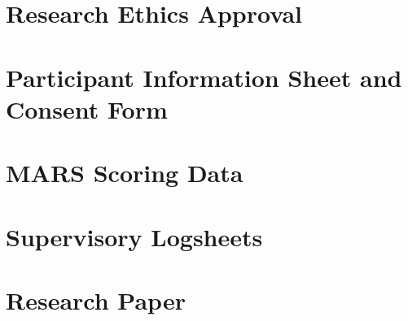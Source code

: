 \documentclass[12pt,a4paper,oneside]{report}
\begin{document}
\appendix

\chapter{Research Ethics Approval}

\chapter{Participant Information Sheet and Consent Form}

\chapter{MARS Scoring Data}

\chapter{Supervisory Logsheets}

\chapter{Research Paper}
\end{document}
